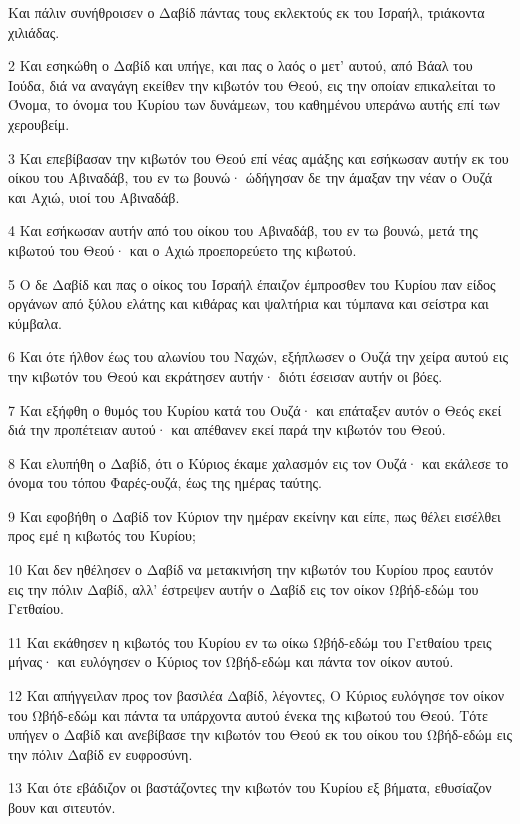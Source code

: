 \par Και πάλιν συνήθροισεν ο Δαβίδ πάντας τους εκλεκτούς εκ του Ισραήλ, τριάκοντα χιλιάδας.
\par 2 Και εσηκώθη ο Δαβίδ και υπήγε, και πας ο λαός ο μετ' αυτού, από Βάαλ του Ιούδα, διά να αναγάγη εκείθεν την κιβωτόν του Θεού, εις την οποίαν επικαλείται το Όνομα, το όνομα του Κυρίου των δυνάμεων, του καθημένου υπεράνω αυτής επί των χερουβείμ.
\par 3 Και επεβίβασαν την κιβωτόν του Θεού επί νέας αμάξης και εσήκωσαν αυτήν εκ του οίκου του Αβιναδάβ, του εν τω βουνώ· ώδήγησαν δε την άμαξαν την νέαν ο Ουζά και Αχιώ, υιοί του Αβιναδάβ.
\par 4 Και εσήκωσαν αυτήν από του οίκου του Αβιναδάβ, του εν τω βουνώ, μετά της κιβωτού του Θεού· και ο Αχιώ προεπορεύετο της κιβωτού.
\par 5 Ο δε Δαβίδ και πας ο οίκος του Ισραήλ έπαιζον έμπροσθεν του Κυρίου παν είδος οργάνων από ξύλου ελάτης και κιθάρας και ψαλτήρια και τύμπανα και σείστρα και κύμβαλα.
\par 6 Και ότε ήλθον έως του αλωνίου του Ναχών, εξήπλωσεν ο Ουζά την χείρα αυτού εις την κιβωτόν του Θεού και εκράτησεν αυτήν· διότι έσεισαν αυτήν οι βόες.
\par 7 Και εξήφθη ο θυμός του Κυρίου κατά του Ουζά· και επάταξεν αυτόν ο Θεός εκεί διά την προπέτειαν αυτού· και απέθανεν εκεί παρά την κιβωτόν του Θεού.
\par 8 Και ελυπήθη ο Δαβίδ, ότι ο Κύριος έκαμε χαλασμόν εις τον Ουζά· και εκάλεσε το όνομα του τόπου Φαρές-ουζά, έως της ημέρας ταύτης.
\par 9 Και εφοβήθη ο Δαβίδ τον Κύριον την ημέραν εκείνην και είπε, πως θέλει εισέλθει προς εμέ η κιβωτός του Κυρίου;
\par 10 Και δεν ηθέλησεν ο Δαβίδ να μετακινήση την κιβωτόν του Κυρίου προς εαυτόν εις την πόλιν Δαβίδ, αλλ' έστρεψεν αυτήν ο Δαβίδ εις τον οίκον Ωβήδ-εδώμ του Γετθαίου.
\par 11 Και εκάθησεν η κιβωτός του Κυρίου εν τω οίκω Ωβήδ-εδώμ του Γετθαίου τρεις μήνας· και ευλόγησεν ο Κύριος τον Ωβήδ-εδώμ και πάντα τον οίκον αυτού.
\par 12 Και απήγγειλαν προς τον βασιλέα Δαβίδ, λέγοντες, Ο Κύριος ευλόγησε τον οίκον του Ωβήδ-εδώμ και πάντα τα υπάρχοντα αυτού ένεκα της κιβωτού του Θεού. Τότε υπήγεν ο Δαβίδ και ανεβίβασε την κιβωτόν του Θεού εκ του οίκου του Ωβήδ-εδώμ εις την πόλιν Δαβίδ εν ευφροσύνη.
\par 13 Και ότε εβάδιζον οι βαστάζοντες την κιβωτόν του Κυρίου εξ βήματα, εθυσίαζον βουν και σιτευτόν.
